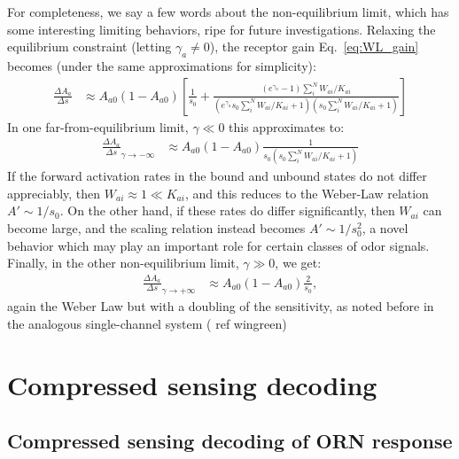 \documentclass[9pt,twoside]{pnas-new}
\begin{document}
For completeness, we say a few words about the non-equilibrium limit, which has some interesting limiting behaviors, ripe for future investigations. Relaxing the equilibrium constraint (letting $\gamma_a \ne 0$), the receptor gain Eq.~\ref{eq:WL_gain} becomes (under the same approximations for simplicity):
\begin{align}
    \frac{\Delta A_a}{\Delta s} &\approx
    A_{a0}(1 - A_{a0})
    \left[
    \frac{1}{s_0}
    + \frac
        {(e^{\gamma_a} - 1)\sum_i^NW_{ai}/K_{ai}}
        {(e^{\gamma_a}s_0\sum_i^NW_{ai}/K_{ai} + 1)(s_0\sum_i^NW_{ai}/K_{ai} + 1)}
    \right]
\end{align}
In one far-from-equilibrium limit, $\gamma \ll 0$ this approximates to:
\begin{align}
    \frac{\Delta A_a}{\Delta s}_{\gamma \rightarrow -\infty} 
    &\approx
    A_{a0}(1 - A_{a0})
    \frac{1}{s_0(s_0\sum_i^NW_{ai}/K_{ai} + 1)}
\end{align}
If the forward activation rates in the bound and unbound states do not 
differ appreciably, then $W_{ai} \approx 1 \ll K_{ai}$, and this reduces to the Weber-Law relation $A' \sim 1/s_0$. On the other hand, if these rates do differ significantly, then $W_{ai}$ can become large, and the scaling relation instead becomes $A' \sim 1/s_0^2$, a novel behavior which may play an important role for certain classes of odor signals. 
Finally, in the other non-equilibrium limit, $\gamma \gg 0$, we get:
\begin{align}
    \frac{\Delta A_a}{\Delta s}_{\gamma \rightarrow +\infty} 
    &\approx
    A_{a0}(1 - A_{a0})
    \frac{2}{s_0},
\end{align}
again the Weber Law but with a doubling of the sensitivity, as noted before in the analogous single-channel system ({\color{blue} ref wingreen})
\fi





\section*{Compressed sensing decoding}

\subsection*{Compressed sensing decoding of ORN response}
\end{document}
